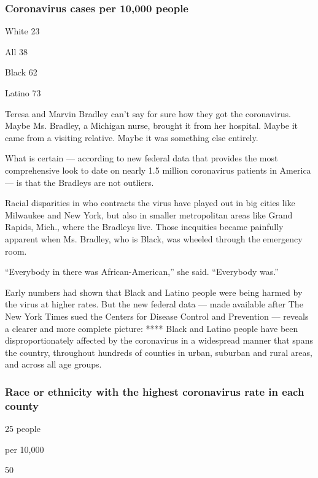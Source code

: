 \hypertarget{coronavirus-cases-per-10000-people}{%
\subsubsection{Coronavirus cases per 10,000
people}\label{coronavirus-cases-per-10000-people}}

White 23

All 38

Black 62

Latino 73

Teresa and Marvin Bradley can't say for sure how they got the
coronavirus. Maybe Ms. Bradley, a Michigan nurse, brought it from her
hospital. Maybe it came from a visiting relative. Maybe it was something
else entirely.

What is certain --- according to new federal data that provides the most
comprehensive look to date on nearly 1.5 million coronavirus patients in
America --- is that the Bradleys are not outliers.

Racial disparities in who contracts the virus have played out in big
cities like Milwaukee and New York, but also in smaller metropolitan
areas like Grand Rapids, Mich., where the Bradleys live. Those
inequities became painfully apparent when Ms. Bradley, who is Black, was
wheeled through the emergency room.

``Everybody in there was African-American,'' she said. ``Everybody
was.''

Early numbers had shown that Black and Latino people were being harmed
by the virus at higher rates. But the new federal data --- made
available after The New York Times sued the Centers for Disease Control
and Prevention --- reveals a clearer and more complete picture: ****
Black and Latino people have been disproportionately affected by the
coronavirus in a widespread manner that spans the country, throughout
hundreds of counties in urban, suburban and rural areas, and across all
age groups.

\hypertarget{race-or-ethnicity-with-the-highest-coronavirus-rate-in-each-county}{%
\subsubsection{Race or ethnicity with the highest coronavirus rate in
each
county}\label{race-or-ethnicity-with-the-highest-coronavirus-rate-in-each-county}}

25 people

per 10,000

50

